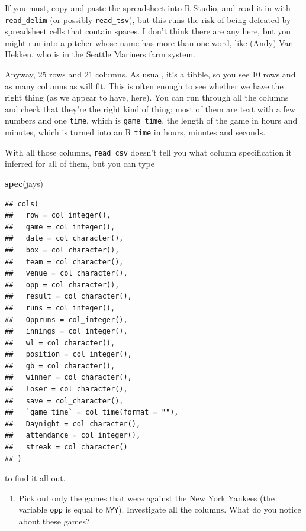 \documentclass[]{tufte-book}
\newenvironment{Shaded}{}{}
\newcommand{\KeywordTok}[1]{\textcolor[rgb]{0.00,0.44,0.13}{\textbf{#1}}}
\newcommand{\NormalTok}[1]{#1}
\providecommand{\tightlist}{%
  \setlength{\itemsep}{0pt}\setlength{\parskip}{0pt}}
\theoremstyle{definition}
\theoremstyle{definition}
\theoremstyle{definition}
\theoremstyle{remark}
\begin{document}
If you must, copy and paste the spreadsheet into R Studio, and read it
in with \texttt{read\_delim} (or possibly \texttt{read\_tsv}), but this
runs the risk of being defeated by spreadsheet cells that contain
spaces. I don't think there are any here, but you might run into a
pitcher whose name has more than one word, like (Andy) Van Hekken, who
is in the Seattle Mariners farm system.

Anyway, 25 rows and 21 columns. As usual, it's a tibble, so you see 10
rows and as many columns as will fit. This is often enough to see
whether we have the right thing (as we appear to have, here). You can
run through all the columns and check that they're the right kind of
thing; most of them are text with a few numbers and one \texttt{time},
which is \texttt{game\ time}, the length of the game in hours and
minutes, which is turned into an R \texttt{time} in hours, minutes and
seconds.

With all those columns, \texttt{read\_csv} doesn't tell you what column
specification it inferred for all of them, but you can type

\begin{Shaded}
\begin{Highlighting}[]
\KeywordTok{spec}\NormalTok{(jays)}
\end{Highlighting}
\end{Shaded}

\begin{verbatim}
## cols(
##   row = col_integer(),
##   game = col_integer(),
##   date = col_character(),
##   box = col_character(),
##   team = col_character(),
##   venue = col_character(),
##   opp = col_character(),
##   result = col_character(),
##   runs = col_integer(),
##   Oppruns = col_integer(),
##   innings = col_integer(),
##   wl = col_character(),
##   position = col_integer(),
##   gb = col_character(),
##   winner = col_character(),
##   loser = col_character(),
##   save = col_character(),
##   `game time` = col_time(format = ""),
##   Daynight = col_character(),
##   attendance = col_integer(),
##   streak = col_character()
## )
\end{verbatim}

to find it all out.

\begin{enumerate}
\def\labelenumi{(\alph{enumi})}
\setcounter{enumi}{1}
\tightlist
\item
  Pick out only the games that were against the New York Yankees (the
  variable \texttt{opp} is equal to \texttt{NYY}). Investigate all the
  columns. What do you notice about these games?
\end{enumerate}
\end{document}
